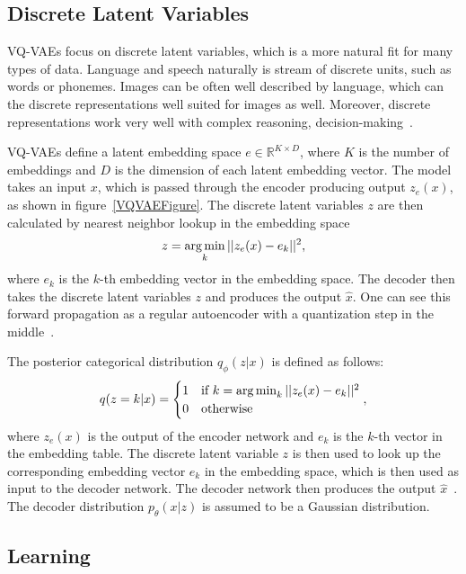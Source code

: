 \subsection{Discrete Latent Variables}

VQ-VAEs focus on discrete latent variables, which is a more natural fit for many types of data. Language and speech naturally is stream of discrete units, such as words or phonemes. Images can be often well described by language, which can the discrete representations well suited for images as well. Moreover, discrete representations work very well with complex reasoning, decision-making~\cite{vqvae}.

VQ-VAEs define a latent embedding space $ e \in \mathbb{R}^{K \times D} $, where $K$ is the number of embeddings and $D$ is the dimension of each latent embedding vector. The model takes an input $x$, which is passed through the encoder producing output $z_e(x)$, as shown in figure~\ref{VQVAEFigure}. 
The discrete latent variables $z$ are then calculated by nearest neighbor lookup in the embedding space
 \[ z = \operatorname*{arg\,min}_{k} || z_e(x) - e_k ||^2,\] 
where $e_k$ is the $k$-th embedding vector in the embedding space. The decoder then takes the discrete latent variables $z$ and produces the output $\hat{x}$. 
One can see this forward propagation as a regular autoencoder with a quantization step in the middle~\cite{vqvae}.

The posterior categorical distribution $q_{\phi}(z|x)$ is defined as follows:
\begin{equation} \label{eqVQVAEPosterior}
    q(z=k|x) = \begin{cases}
        1& \text{if} \ k = \operatorname*{arg\,min}_{k} || z_e(x) - e_k ||^2 \\
        0& \text{otherwise}
    \end{cases},
\end{equation}
where $z_e(x)$ is the output of the encoder network and $e_k$ is the $k$-th vector in the embedding table.
The discrete latent variable $z$ is then used to look up the corresponding embedding vector $e_k$ in the embedding space, which is then used as input to the decoder network. The decoder network then produces the output $\hat{x}$~\cite{vqvae}.
The decoder distribution $p_{\theta}(x|z)$ is assumed to be a Gaussian distribution.

\subsection{Learning}

